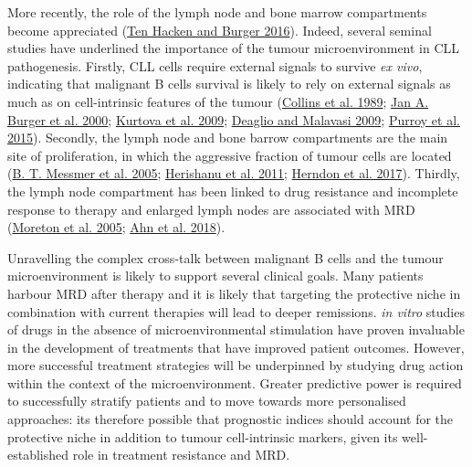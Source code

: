 \documentclass[11pt, a4paper, twosided]{book}
\begin{document}
More recently, the role of the lymph node and bone marrow compartments become appreciated (\protect\hyperlink{ref-tenHacken2016}{Ten Hacken and Burger 2016}). Indeed, several seminal studies have underlined the importance of the tumour microenvironment in CLL pathogenesis. Firstly, CLL cells require external signals to survive \emph{ex vivo}, indicating that malignant B cells survival is likely to rely on external signals as much as on cell-intrinsic features of the tumour (\protect\hyperlink{ref-Collins1989}{Collins et al. 1989}; \protect\hyperlink{ref-Burger2000}{Jan A. Burger et al. 2000}; \protect\hyperlink{ref-Kurtova2009}{Kurtova et al. 2009}; \protect\hyperlink{ref-Deaglio2009}{Deaglio and Malavasi 2009}; \protect\hyperlink{ref-Purroy2015}{Purroy et al. 2015}). Secondly, the lymph node and bone barrow compartments are the main site of proliferation, in which the aggressive fraction of tumour cells are located (\protect\hyperlink{ref-Messmer2005}{B. T. Messmer et al. 2005}; \protect\hyperlink{ref-Herishanu2011}{Herishanu et al. 2011}; \protect\hyperlink{ref-Herndon2017}{Herndon et al. 2017}). Thirdly, the lymph node compartment has been linked to drug resistance and incomplete response to therapy and enlarged lymph nodes are associated with MRD (\protect\hyperlink{ref-Moreton2005}{Moreton et al. 2005}; \protect\hyperlink{ref-Ahn2018}{Ahn et al. 2018}).

Unravelling the complex cross-talk between malignant B cells and the tumour microenvironment is likely to support several clinical goals. Many patients harbour MRD after therapy and it is likely that targeting the protective niche in combination with current therapies will lead to deeper remissions. \emph{in vitro} studies of drugs in the absence of microenvironmental stimulation have proven invaluable in the development of treatments that have improved patient outcomes. However, more successful treatment strategies will be underpinned by studying drug action within the context of the microenvironment. Greater predictive power is required to successfully stratify patients and to move towards more personalised approaches: its therefore possible that prognostic indices should account for the protective niche in addition to tumour cell-intrinsic markers, given its well-established role in treatment resistance and MRD.
\end{document}
